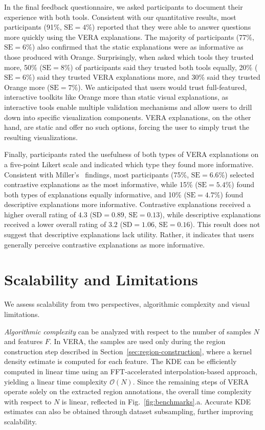 \documentclass[lettersize,journal]{IEEEtran}
\providecommand{\DIFaddbegin}{} %
\providecommand{\DIFaddend}{} %
\providecommand{\DIFaddincludegraphics}[2][]{{\color{blue}\fbox{\DIFOincludegraphics[#1]{#2}}}} %
\DeclareRobustCommand{\DIFaddbegin}{\DIFOaddbegin \let\includegraphics\DIFaddincludegraphics} %
\DeclareRobustCommand{\DIFaddend}{\DIFOaddend \let\includegraphics\DIFOincludegraphics} %
\begin{document}
In the final feedback questionnaire, we asked participants to document their experience with both tools. Consistent with our quantitative results, most participants (91\%, $\text{SE}=4\%$) reported that they were able to answer questions more quickly using the VERA explanations. The majority of participants (77\%, $\text{SE}=6\%$) also confirmed that the static explanations were as informative as those produced with Orange.
Surprisingly, when asked which tools they trusted more, 50\% ($\text{SE}=8\%$) of participants said they trusted both tools equally, 20\% ($\text{SE}=6\%$) said they trusted VERA explanations more, and 30\% said they trusted Orange more ($\text{SE}=7\%$). 
We anticipated that users would trust full-featured, interactive toolkits like Orange more than static visual explanations, as interactive tools enable multiple validation mechanisms and allow users to drill down into specific visualization components. VERA explanations, on the other hand, are static and offer no such options, forcing the user to simply trust the resulting visualizations.

Finally, participants rated the usefulness of both types of VERA explanations on a five-point Likert scale and indicated which type they found more informative. Consistent with Miller's~\cite{Miller2019} findings, most participants (75\%, $\text{SE}=6.6\%$) selected contrastive explanations as the most informative, while 15\% ($\text{SE}=5.4\%$) found both types of explanations equally informative, and 10\% ($\text{SE}=4.7\%$) found descriptive explanations more informative.
Contrastive explanations received a higher overall rating of $4.3$ ($\text{SD}= 0.89$, $\text{SE}=0.13$), while descriptive explanations received a lower overall rating of $3.2$ ($\text{SD}= 1.06$, $\text{SE}=0.16$).
This result does not suggest that descriptive explanations lack utility. Rather, it indicates that users generally perceive contrastive explanations as more informative.

\section{Scalability and Limitations}
\DIFaddbegin \label{sec:scalability}
\DIFaddend 

We assess scalability from two perspectives, algorithmic complexity and visual limitations.

\textit{Algorithmic complexity} can be analyzed with respect to the number of samples $N$ and features $F$.
In VERA, the samples are used only during the region construction step described in Section~\ref{sec:region-construction}, where a kernel density estimate is computed for each feature. The KDE can be efficiently computed in linear time using an FFT-accelerated interpolation-based approach, yielding a linear time complexity $\mathcal{O}(N)$.
Since the remaining steps of VERA operate solely on the extracted region annotations, the overall time complexity with respect to $N$ is linear, reflected in Fig.~\ref{fig:benchmarks}.a. Accurate KDE estimates can also be obtained through dataset subsampling, further improving scalability.
\end{document}
